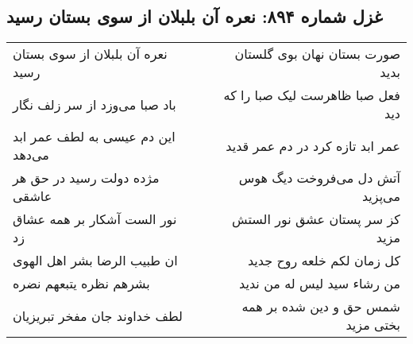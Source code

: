 \begin{center}
\section*{غزل شماره ۸۹۴: نعره آن بلبلان از سوی بستان رسید}
\label{sec:0894}
\begin{longtable}{l p{0.5cm} r}
نعره آن بلبلان از سوی بستان رسید
&&
صورت بستان نهان بوی گلستان بدید
\\
باد صبا می‌وزد از سر زلف نگار
&&
فعل صبا ظاهرست لیک صبا را که دید
\\
این دم عیسی به لطف عمر ابد می‌دهد
&&
عمر ابد تازه کرد در دم عمر قدید
\\
مژده دولت رسید در حق هر عاشقی
&&
آتش دل می‌فروخت دیگ هوس می‌پزید
\\
نور الست آشکار بر همه عشاق زد
&&
کز سر پستان عشق نور الستش مزید
\\
ان طبیب الرضا بشر اهل الهوی
&&
کل زمان لکم خلعه روح جدید
\\
بشرهم نظره یتبعهم نضره
&&
من رشاء سید لیس له من ندید
\\
لطف خداوند جان مفخر تبریزیان
&&
شمس حق و دین شده بر همه بختی مزید
\\
\end{longtable}
\end{center}
